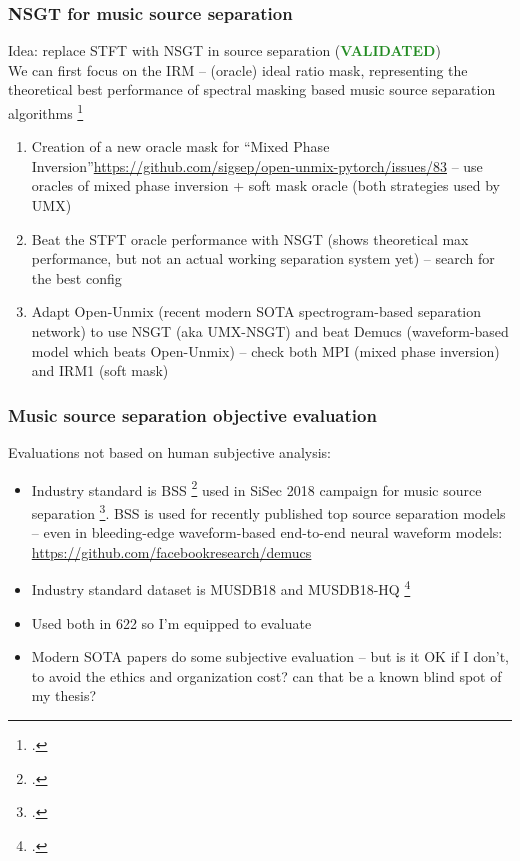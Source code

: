 \documentclass[usenames,dvipsnames]{beamer}
\begin{document}
\begin{frame}
	\frametitle{NSGT for music source separation}
	Idea: replace STFT with NSGT in source separation (\textcolor{ForestGreen}{\textbf{VALIDATED}})\\
	We can first focus on the IRM -- (oracle) ideal ratio mask, representing the theoretical  best performance of spectral masking based music source separation algorithms \footcite{irm, sisec2018, vincent07}\\
	\begin{enumerate}
		\item
			Creation of a new oracle mask for ``Mixed Phase Inversion''\href{https://github.com/sigsep/open-unmix-pytorch/issues/83}{https://github.com/sigsep/open-unmix-pytorch/issues/83} -- use oracles of mixed phase inversion + soft mask oracle (both strategies used by UMX)
		\item
			Beat the STFT oracle performance with NSGT (shows theoretical max performance, but not an actual working separation system yet) -- search for the best config
		\item
			Adapt Open-Unmix (recent modern SOTA spectrogram-based separation network) to use NSGT (aka UMX-NSGT) and beat Demucs (waveform-based model which beats Open-Unmix) -- check both MPI (mixed phase inversion) and IRM1 (soft mask)
	\end{enumerate}
\end{frame}

\begin{frame}
	\frametitle{Music source separation objective evaluation}
	Evaluations not based on human subjective analysis:
	\begin{itemize}
		\item
			Industry standard is BSS \footcite{bss} used in SiSec 2018 campaign for music source separation \footcite{sisec2018}. BSS is used for recently published top source separation models -- even in bleeding-edge waveform-based end-to-end neural waveform models: \href{https://github.com/facebookresearch/demucs}{https://github.com/facebookresearch/demucs}
		\item
			Industry standard dataset is MUSDB18 and MUSDB18-HQ \footcite{musdb18, musdb18hq}
		\item
			Used both in 622 so I'm equipped to evaluate
		\item
			Modern SOTA papers do some subjective evaluation -- but is it OK if I don't, to avoid the ethics and organization cost? can that be a known blind spot of my thesis?
	\end{itemize}
\end{frame}
\end{document}
